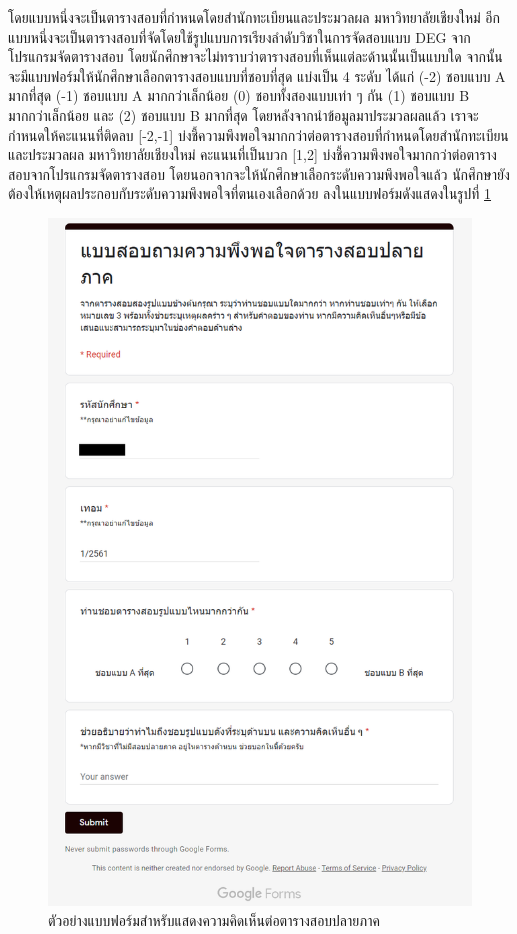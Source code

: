 %
โดยแบบหนึ่งจะเป็นตารางสอบที่กำหนดโดยสำนักทะเบียนและประมวลผล มหาวิทยาลัยเชียงใหม่ 
อีกแบบหนึ่งจะเป็นตารางสอบที่จัดโดยใช้รูปแบบการเรียงลำดับวิชาในการจัดสอบแบบ DEG จากโปรแกรมจัดตารางสอบ
โดยนักศึกษาจะไม่ทราบว่าตารางสอบที่เห็นแต่ละด้านนั้นเป็นแบบใด จากนั้นจะมีแบบฟอร์มให้นักศึกษาเลือกตารางสอบแบบที่ชอบที่สุด แบ่งเป็น 4 ระดับ ได้แก่ (-2) ชอบแบบ A มากที่สุด (-1) ชอบแบบ A มากกว่าเล็กน้อย (0) ชอบทั้งสองแบบเท่า ๆ กัน (1) ชอบแบบ B มากกว่าเล็กน้อย และ (2) ชอบแบบ B มากที่สุด 
โดยหลังจากนำข้อมูลมาประมวลผลแล้ว เราจะกำหนดให้คะแนนที่ติดลบ [-2,-1] บ่งชี้ความพึงพอใจมากกว่าต่อตารางสอบที่กำหนดโดยสำนักทะเบียนและประมวลผล มหาวิทยาลัยเชียงใหม่
คะแนนที่เป็นบวก [1,2] บ่งชี้ความพึงพอใจมากกว่าต่อตารางสอบจากโปรแกรมจัดตารางสอบ โดยนอกจากจะให้นักศึกษาเลือกระดับความพึงพอใจแล้ว นักศึกษายังต้องให้เหตุผลประกอบกับระดับความพึงพอใจที่ตนเองเลือกด้วย
ลงในแบบฟอร์มดังแสดงในรูปที่ \ref{fig:eval_ui_form}
%
\begin{figure}
    \begin{center}
      \includegraphics[width=0.9\linewidth]{images/eval_ui_form.png}
    \end{center}
    \caption[ตัวอย่างแบบฟอร์มสำหรับแสดงความคิดเห็นต่อตารางสอบปลายภาค]{ตัวอย่างแบบฟอร์มสำหรับแสดงความคิดเห็นต่อตารางสอบปลายภาค}
    \label{fig:eval_ui_form}     
\end{figure}

